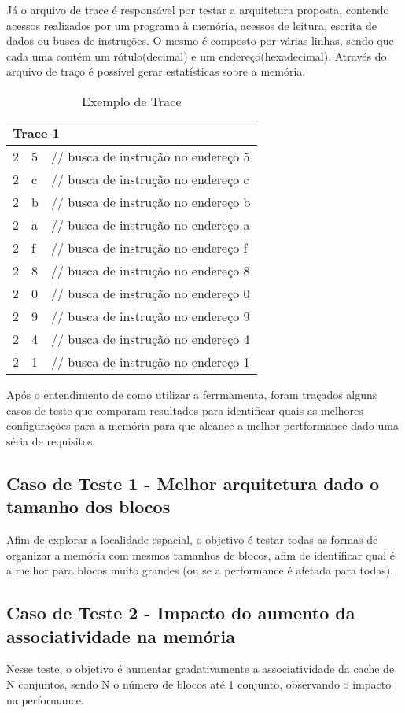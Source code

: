 \documentclass[conference]{IEEEtran}
\begin{document}
Já o arquivo de trace é responsável por testar a arquitetura proposta, contendo acessos realizados por um programa à memória, acessos de leitura, escrita de dados ou busca de instruções. O mesmo é composto por várias linhas, sendo que cada uma contém um rótulo(decimal) e um endereço(hexadecimal). Através do arquivo de traço é possível gerar estatísticas sobre a memória.

\begin{table}[h!]
\centering
\begin{tabular}{lll}
\hline
\multicolumn{3}{l}{\textbf{Trace 1}} \\ \hline
2 & 5 & // busca de instrução no endereço 5 \\ 
2 & c & // busca de instrução no endereço c \\ 
2 & b & // busca de instrução no endereço b \\ 
2 & a & // busca de instrução no endereço a \\ 
2 & f & // busca de instrução no endereço f \\ 
2 & 8 & // busca de instrução no endereço 8 \\ 
2 & 0 & // busca de instrução no endereço 0 \\ 
2 & 9 & // busca de instrução no endereço 9 \\ 
2 & 4 & // busca de instrução no endereço 4 \\ 
2 & 1 & // busca de instrução no endereço 1 \\ \hline
\end{tabular}
\caption{Exemplo de Trace}
\label{tab:traceAleatorio}
\end{table}

Após o entendimento de como utilizar a ferrmamenta, foram traçados alguns casos de teste que comparam resultados para identificar quais as melhores configurações para a memória para que alcance a melhor pertformance dado uma séria de requisitos.

\subsection{Caso de Teste 1 - Melhor arquitetura dado o tamanho dos blocos}
Afim de explorar a localidade espacial, o objetivo é testar todas as formas de organizar a memória com mesmos tamanhos de blocos, afim de identificar qual é a melhor para blocos muito grandes (ou se a performance é afetada para todas).

\subsection{Caso de Teste 2 - Impacto do aumento da associatividade na memória}
Nesse teste, o objetivo é aumentar gradativamente a associatividade da cache de N conjuntos, sendo N o número de blocos até 1 conjunto, observando o impacto na performance.
\end{document}

